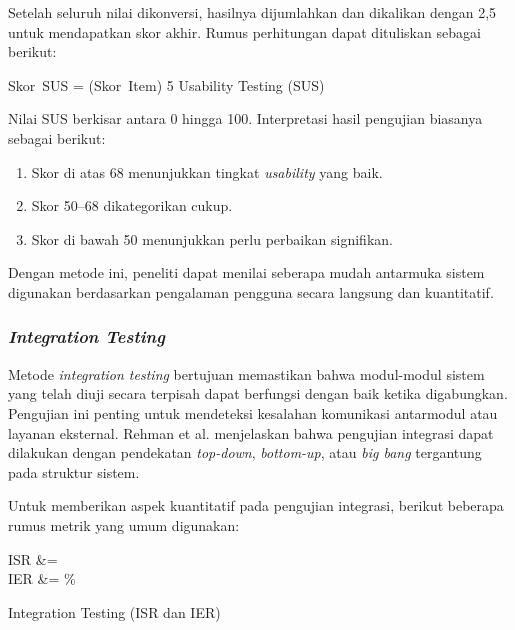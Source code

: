 Setelah seluruh nilai dikonversi, hasilnya dijumlahkan dan dikalikan dengan 2,5 untuk mendapatkan skor akhir. Rumus perhitungan dapat dituliskan sebagai berikut:\par

\begin{equationcaptioned}[eq:2.sus]{
	Skor\ SUS = \left(\sum Skor\ Item\right) 5
}{
	Usability Testing (SUS)
}
\end{equationcaptioned}

Nilai SUS berkisar antara 0 hingga 100. Interpretasi hasil pengujian biasanya sebagai berikut:\par
\begin{enumerate}[noitemsep]
	\item Skor di atas 68 menunjukkan tingkat \textit{usability} yang baik.
	\item Skor 50--68 dikategorikan cukup.
	\item Skor di bawah 50 menunjukkan perlu perbaikan signifikan.
\end{enumerate}

Dengan metode ini, peneliti dapat menilai seberapa mudah antarmuka sistem digunakan berdasarkan pengalaman pengguna secara langsung dan kuantitatif.\par

\subsubsection{\textit{Integration Testing}} \label{II.IntegrationTesting}
Metode \textit{integration testing} bertujuan memastikan bahwa modul-modul sistem yang telah diuji secara terpisah dapat berfungsi dengan baik ketika digabungkan. Pengujian ini penting untuk mendeteksi kesalahan komunikasi antarmodul atau layanan eksternal. Rehman et al. \cite{rehman2007testing} menjelaskan bahwa pengujian integrasi dapat dilakukan dengan pendekatan \textit{top-down}, \textit{bottom-up}, atau \textit{big bang} tergantung pada struktur sistem.\par

Untuk memberikan aspek kuantitatif pada pengujian integrasi, berikut beberapa rumus metrik yang umum digunakan:\par

\begin{equationcaptioned}[eq:2.isr]{
	\begin{split}
		ISR &=  \\[6pt]
		IER &=  \%
	\end{split}
}{
	Integration Testing (ISR dan IER)
}
\end{equationcaptioned}

